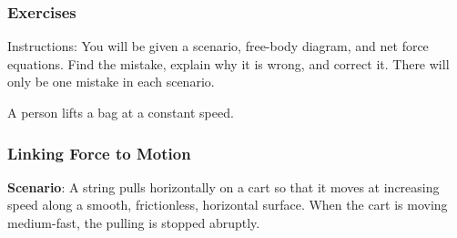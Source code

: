 \documentclass[../main-physics-problems.tex]{subfiles}
\begin{document}
\clearpage

\subsubsection*{Exercises}
Instructions: You will be given a scenario, free-body diagram, and net force equations. Find the mistake, explain why it is wrong, and correct it. There will only be one mistake in each scenario.

\begin{questions}
\question
A person lifts a bag at a constant speed.

\begin{center}
%
%
%

\end{center}
\end{questions}

\clearpage

\subsubsection*{Linking Force to Motion}

\textbf{Scenario}: A string pulls horizontally on a cart so that it moves at increasing speed along a smooth, frictionless, horizontal surface. When the cart is moving medium-fast, the pulling is stopped abruptly.
\end{document}
